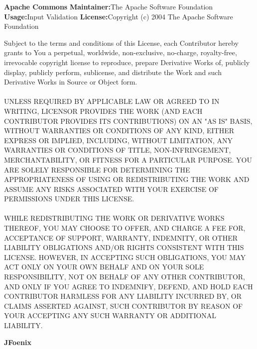 {\bfseries Apache Commons}
\newline
\newline
{\bfseries Maintainer:}{\space The Apache Software Foundation}
\newline
\newline
{\bfseries Usage:}{\space Input Validation}
\newline
\newline
{\bfseries License:}{\space Copyright (c) 2004 The Apache Software Foundation}
\newline
\begin{addmargin}[4.5em]{0em}
    \fontsize{10pt}{12pt}\selectfont
    Subject to the terms and conditions of this License, each Contributor hereby grants to
    You a perpetual, worldwide, non-exclusive, no-charge, royalty-free, irrevocable copyright
    license to reproduce, prepare Derivative Works of, publicly display, publicly perform,
    sublicense, and distribute the Work and such Derivative Works in Source or Object form.
    \\ \\
    \uppercase{Unless required by applicable law or agreed to in writing,
    Licensor provides the Work (and each Contributor provides its Contributions)
    on an "AS IS" BASIS, WITHOUT WARRANTIES OR CONDITIONS OF ANY KIND, either express
    or implied, including, without limitation, any warranties or conditions of TITLE,
    NON-INFRINGEMENT, MERCHANTABILITY, or FITNESS FOR A PARTICULAR PURPOSE. You are
    solely responsible for determining the appropriateness of using or redistributing
    the Work and assume any risks associated with Your exercise of permissions under
    this License.
    \\ \\
    While redistributing the Work or Derivative Works thereof, You may choose to offer,
    and charge a fee for, acceptance of support, warranty, indemnity, or other liability
    obligations and/or rights consistent with this License. However, in accepting such
    obligations, You may act only on Your own behalf and on Your sole responsibility,
    not on behalf of any other Contributor, and only if You agree to indemnify, defend,
    and hold each Contributor harmless for any liability incurred by, or claims asserted
    against, such Contributor by reason of your accepting any such warranty or additional
    liability.}
\end{addmargin}
\newpage
{\bfseries JFoenix}
\newline
\newline
